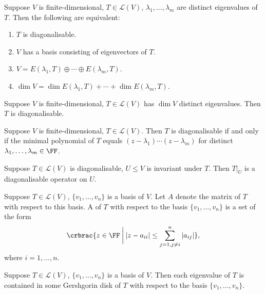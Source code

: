 \begin{lemma}
Suppose $V$ is finite-dimensional, $T\in\mathcal{L}(V)$, $\lambda_1,\dots,\lambda_m$ are distinct eigenvalues of $T$. Then the following are equivalent:
\begin{enumerate}[label=(\roman*)]
\item $T$ is diagonalisable.
\item $V$ has a basis consisting of eigenvectors of $T$.
\item $V=E(\lambda_1,T)\oplus\cdots\oplus E(\lambda_m,T)$.
\item $\dim V=\dim E(\lambda_1,T)+\cdots+\dim E(\lambda_m,T)$.
\end{enumerate}
\end{lemma}

\begin{corollary}
Suppose $V$ is finite-dimensional, $T\in\mathcal{L}(V)$ has $\dim V$ distinct eigenvalues. Then $T$ is diagonalisable.
\end{corollary}

\begin{theorem}
Suppose $V$ is finite-dimensional, $T\in\mathcal{L}(V)$. Then $T$ is diagonalisable if and only if the minimal polynomial of $T$ equals $(z-\lambda_1)\cdots(z-\lambda_m)$ for distinct $\lambda_1,\dots,\lambda_m\in\FF$.
\end{theorem}

\begin{corollary}
Suppose $T\in\mathcal{L}(V)$ is diagonalisable, $U\le V$ is invariant under $T$. Then $T|_U$ is a diagonalisable operator on $U$.
\end{corollary}

\begin{definition}
Suppose $T\in\mathcal{L}(V)$, $\{v_1,\dots,v_n\}$ is a basis of $V$. Let $A$ denote the matrix of $T$ with respect to this basis. A  of $T$ with respect to the basis $\{v_1,\dots,v_n\}$ is a set of the form
\[\crbrac{z\in\FF\:\bigg|\:|z-a_{ii}|\le\sum_{j=1,j\neq i}^{n}|a_{ij}|},\]
where $i=1,\dots,n$.
\end{definition}

\begin{theorem}
Suppose $T\in\mathcal{L}(V)$, $\{v_1,\dots,v_n\}$ is a basis of $V$. Then each eigenvalue of $T$ is contained in some Gershgorin disk of $T$ with respect to the basis $\{v_1,\dots,v_n\}$.
\end{theorem}
\pagebreak

